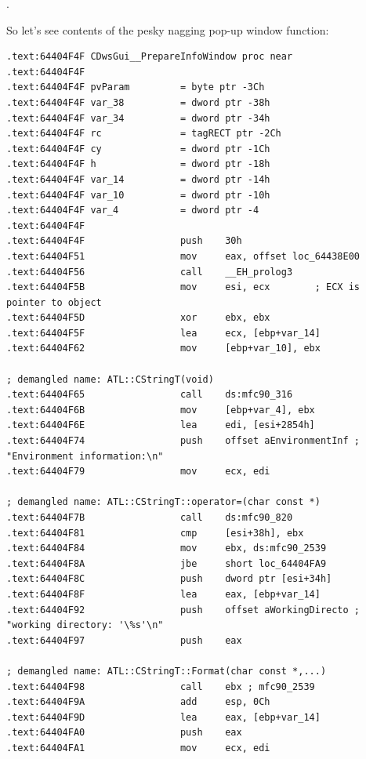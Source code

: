 .

{So let's see contents of the pesky nagging pop-up window function}:

\begin{lstlisting}
.text:64404F4F CDwsGui__PrepareInfoWindow proc near
.text:64404F4F
.text:64404F4F pvParam         = byte ptr -3Ch
.text:64404F4F var_38          = dword ptr -38h
.text:64404F4F var_34          = dword ptr -34h
.text:64404F4F rc              = tagRECT ptr -2Ch
.text:64404F4F cy              = dword ptr -1Ch
.text:64404F4F h               = dword ptr -18h
.text:64404F4F var_14          = dword ptr -14h
.text:64404F4F var_10          = dword ptr -10h
.text:64404F4F var_4           = dword ptr -4
.text:64404F4F
.text:64404F4F                 push    30h
.text:64404F51                 mov     eax, offset loc_64438E00
.text:64404F56                 call    __EH_prolog3
.text:64404F5B                 mov     esi, ecx        ; ECX is pointer to object
.text:64404F5D                 xor     ebx, ebx
.text:64404F5F                 lea     ecx, [ebp+var_14]
.text:64404F62                 mov     [ebp+var_10], ebx

; demangled name: ATL::CStringT(void)
.text:64404F65                 call    ds:mfc90_316    
.text:64404F6B                 mov     [ebp+var_4], ebx
.text:64404F6E                 lea     edi, [esi+2854h]
.text:64404F74                 push    offset aEnvironmentInf ; "Environment information:\n"
.text:64404F79                 mov     ecx, edi

; demangled name: ATL::CStringT::operator=(char const *)
.text:64404F7B                 call    ds:mfc90_820
.text:64404F81                 cmp     [esi+38h], ebx
.text:64404F84                 mov     ebx, ds:mfc90_2539
.text:64404F8A                 jbe     short loc_64404FA9
.text:64404F8C                 push    dword ptr [esi+34h]
.text:64404F8F                 lea     eax, [ebp+var_14]
.text:64404F92                 push    offset aWorkingDirecto ; "working directory: '\%s'\n"
.text:64404F97                 push    eax

; demangled name: ATL::CStringT::Format(char const *,...)
.text:64404F98                 call    ebx ; mfc90_2539
.text:64404F9A                 add     esp, 0Ch
.text:64404F9D                 lea     eax, [ebp+var_14]
.text:64404FA0                 push    eax
.text:64404FA1                 mov     ecx, edi


\end{lstlisting}
